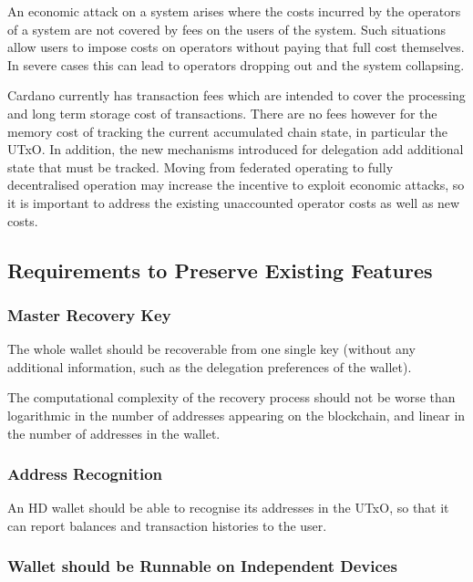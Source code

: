 \documentclass[11pt,a4paper]{article}
\begin{document}
An economic attack on a system arises where the costs incurred by the
operators of a system are not covered by fees on the users of the
system. Such situations allow users to impose costs on operators without
paying that full cost themselves. In severe cases this can lead to
operators dropping out and the system collapsing.

Cardano currently has transaction fees which are intended to cover the
processing and long term storage cost of transactions. There are no fees
however for the memory cost of tracking the current accumulated chain
state, in particular the UTxO. In addition, the new mechanisms
introduced for delegation add additional state that must be tracked.
Moving from federated operating to fully decentralised operation may
increase the incentive to exploit economic attacks, so it is important
to address the existing unaccounted operator costs as well as new costs.

\subsection{Requirements to Preserve Existing
Features}\label{requirements-to-preserve-existing-features}

\subsubsection{Master Recovery Key}\label{master-recovery-key}

The whole wallet should be recoverable from one single key (without any
additional information, such as the delegation preferences of the
wallet).

The computational complexity of the recovery process should not be worse
than logarithmic in the number of addresses appearing on the blockchain,
and linear in the number of addresses in the wallet.

\subsubsection{Address Recognition}\label{address-recognition}

An HD wallet should be able to recognise its addresses in the UTxO, so
that it can report balances and transaction histories to the user.

\subsubsection{Wallet should be Runnable on Independent
Devices}\label{wallet-should-be-runnable-on-independent-devices}
\end{document}
